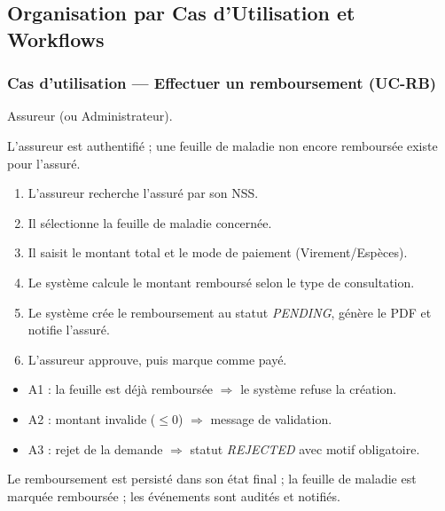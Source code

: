 \documentclass[11pt,a4paper]{article}
\begin{document}
\subsection{Organisation par Cas d'Utilisation et Workflows}

\subsubsection{Cas d'utilisation — Effectuer un remboursement (UC-RB)}
\begin{description}[leftmargin=2.2cm,style=nextline]
  \item[Acteur principal] Assureur (ou Administrateur).
  \item[Préconditions] L'assureur est authentifié ; une feuille de maladie non encore
  remboursée existe pour l'assuré.
  \item[Scénario nominal]
  \begin{enumerate}[leftmargin=1.6em]
    \item L'assureur recherche l'assuré par son NSS.
    \item Il sélectionne la feuille de maladie concernée.
    \item Il saisit le montant total et le mode de paiement (Virement/Espèces).
    \item Le système calcule le montant remboursé selon le type de consultation.
    \item Le système crée le remboursement au statut \emph{PENDING}, génère le PDF et
    notifie l'assuré.
    \item L'assureur approuve, puis marque comme payé.
  \end{enumerate}
  \item[Scénarios alternatifs]
  \begin{itemize}[leftmargin=1.6em]
    \item A1 : la feuille est déjà remboursée $\Rightarrow$ le système refuse la création.
    \item A2 : montant invalide ($\leq 0$) $\Rightarrow$ message de validation.
    \item A3 : rejet de la demande $\Rightarrow$ statut \emph{REJECTED} avec motif obligatoire.
  \end{itemize}
  \item[Post-conditions] Le remboursement est persisté dans son état final ; la feuille
  de maladie est marquée remboursée ; les événements sont audités et notifiés.
\end{description}
\end{document}
